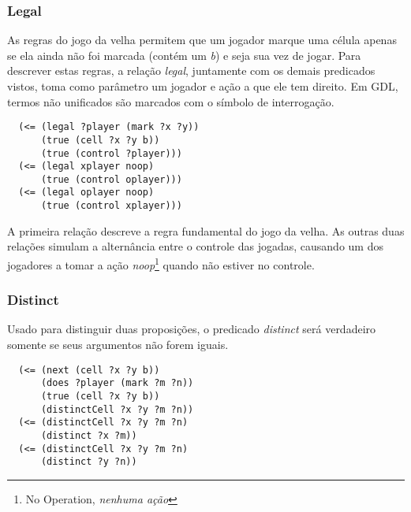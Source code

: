 \subsubsection*{Legal}
As regras do jogo da velha permitem que um jogador marque uma célula apenas se ela ainda não foi marcada (contém um \textit{b}) e seja sua vez de jogar. Para descrever estas regras, a relação \textit{legal}, juntamente com os demais predicados vistos, toma como parâmetro um jogador e ação a que ele tem direito. Em GDL, termos não unificados são marcados com o símbolo de interrogação.
\begin{verbatim}                                                                                         
  (<= (legal ?player (mark ?x ?y))                                                                       
      (true (cell ?x ?y b))                                                                              
      (true (control ?player)))                                                                          
  (<= (legal xplayer noop)                                                                               
      (true (control oplayer)))                                                                          
  (<= (legal oplayer noop)                                                                               
      (true (control xplayer)))                                                                          
\end{verbatim}
A primeira relação descreve a regra fundamental do jogo da velha. As outras duas relações simulam a alternância entre o controle das jogadas, causando um dos jogadores a tomar a ação \textit{noop}\footnote{No Operation, \textit{nenhuma ação}} quando não estiver no controle.

\subsubsection*{Distinct}
Usado para distinguir duas proposições, o predicado \textit{distinct} será verdadeiro somente se seus argumentos não forem iguais.
\begin{verbatim}                                                                                         
  (<= (next (cell ?x ?y b))                                                                              
      (does ?player (mark ?m ?n))                                                                        
      (true (cell ?x ?y b))                                                                              
      (distinctCell ?x ?y ?m ?n))                                                                        
  (<= (distinctCell ?x ?y ?m ?n)                                                                         
      (distinct ?x ?m))                                                                                                                                                
  (<= (distinctCell ?x ?y ?m ?n)                                                                         
      (distinct ?y ?n))                                                                                  
\end{verbatim}

